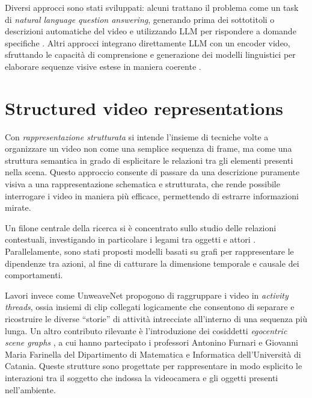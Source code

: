 Diversi approcci sono stati sviluppati: alcuni trattano il problema come un task di \emph{natural language question answering}, generando prima dei sottotitoli o descrizioni automatiche del video e utilizzando LLM per rispondere a domande specifiche \cite{ma2024drvideodocumentretrievalbased, park2025framesusefulefficientstrategies, wang2024videoagentlongformvideounderstanding, wang2024lifelongmemoryleveragingllmsanswering, wang2025videotreeadaptivetreebasedvideo, wu2022memvitmemoryaugmentedmultiscalevision}. Altri approcci integrano direttamente LLM con un encoder video, sfruttando le capacità di comprensione e generazione dei modelli linguistici per elaborare sequenze visive estese in maniera coerente \cite{li2024llmsmeetlongvideo, qian2024streaminglongvideounderstanding, ren2024timechattimesensitivemultimodallarge, song2024moviechatdensetokensparse}.

\section{Structured video representations}

Con \emph{rappresentazione strutturata} si intende l'insieme di tecniche volte a organizzare un video non come una semplice sequenza di frame, ma come una struttura semantica in grado di esplicitare le relazioni tra gli elementi presenti nella scena. Questo approccio consente di passare da una descrizione puramente visiva a una rappresentazione schematica e strutturata, che rende possibile interrogare i video in maniera più efficace, permettendo di estrarre informazioni mirate.

Un filone centrale della ricerca si è concentrato sullo studio delle relazioni contestuali, investigando in particolare i legami tra oggetti e attori \cite{arnab2021unifiedgraphstructuredmodels, baradel2018objectlevelvisualreasoning, cong2021spatialtemporaltransformerdynamicscene, jain2016structuralrnndeeplearningspatiotemporal, ji2019actiongenomeactionscomposition, ma2018attendinteracthigherorderobject, sun2018actorcentricrelationnetwork, wang2018videosspacetimeregiongraphs}. Parallelamente, sono stati proposti modelli basati su grafi per rappresentare le dipendenze tra azioni, al fine di catturare la dimensione temporale e causale dei comportamenti.

Lavori invece come UnweaveNet \cite{price2022unweavenetunweavingactivitystories} propogono di raggruppare i video in \emph{activity threads}, ossia insiemi di clip collegati logicamente che consentono di separare e ricostruire le diverse “storie” di attività intrecciate all'interno di una sequenza più lunga. Un altro contributo rilevante è l'introduzione dei cosiddetti \emph{egocentric scene graphs} \cite{rodin2023actionscenegraphslongform}, a cui hanno partecipato i professori Antonino Furnari e Giovanni Maria Farinella del Dipartimento di Matematica e Informatica dell'Università di Catania. Queste strutture sono progettate per rappresentare in modo esplicito le interazioni tra il soggetto che indossa la videocamera e gli oggetti presenti nell'ambiente.

